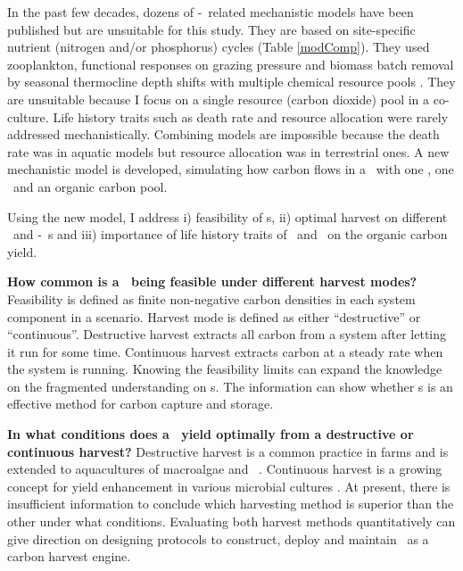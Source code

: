 \documentclass[../thesis.tex]{subfiles} %
\begin{document}
In the past few decades, dozens of \phy-\bac\ related mechanistic models have been published but are unsuitable for this study.  They are based on site-specific nutrient (nitrogen and/or phosphorus) cycles (Table \ref{modComp}).  They used zooplankton, functional responses on grazing pressure and biomass batch removal by seasonal thermocline depth shifts \autocite{anderson2015empower,kidston2013phytoplankton,llebot2010role}
with multiple chemical resource pools \autocite{llebot2010role,mitra2009closure,findlay2006modelling}.  They are unsuitable because I focus on a single resource (carbon dioxide) pool in a co-culture.  Life history traits such as death rate \autocite{anderson2015empower,kidston2013phytoplankton} and resource allocation \autocite{xiao1996relative} were rarely addressed mechanistically.  Combining models are impossible because the death rate was in aquatic models but resource allocation was in terrestrial ones.  A new mechanistic model is developed, simulating how carbon flows in a \pbs\ with one \phy, one \bacm\ and an organic carbon pool.

Using the new model, I address \Rn{1}) feasibility of \pbs s, \Rn{2}) optimal harvest on different \phy\ and \phy-\bac\ \pbs s and \Rn{3}) importance of life history traits of \phy\ and \bac\ on the organic carbon yield.

\textbf{How common is a \pbs\ being feasible under different harvest modes?}  Feasibility is defined as finite non-negative carbon densities in each system component in a scenario.  Harvest mode is defined as either ``destructive” or ``continuous”.  Destructive harvest extracts all carbon from a system after letting it run for some time.  Continuous harvest extracts carbon at a steady rate when the system is running.  Knowing the feasibility limits can expand the knowledge on the fragmented understanding \autocite{fuentes2016impact} on \pbs s.  The information can show whether \pbs s is an effective method for carbon capture and storage.

\textbf{In what conditions does a \pbs\ yield optimally from a destructive or continuous harvest?}  Destructive harvest is a common practice in farms and is extended to aquacultures of macroalgae \autocite{duarte2017can} and \phy\  \autocite{evanson_2019}.  Continuous harvest is a growing concept for yield enhancement in various microbial cultures \autocite{aytekin2016statistical,fuentes2016impact}.  At present, there is insufficient information to conclude which harvesting method is superior than the other under what conditions.  Evaluating both harvest methods quantitatively can give direction on designing protocols to construct, deploy and maintain \pbs\ as a carbon harvest engine.
\end{document}
